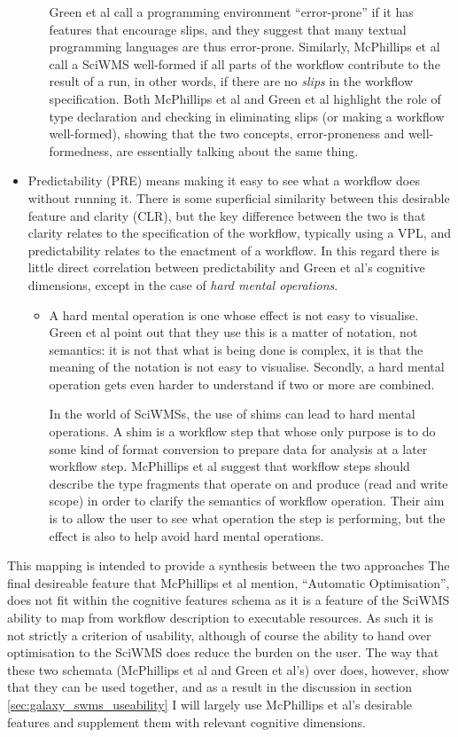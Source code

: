 \documentclass[a4paper,10pt]{scrreprt}
\begin{document}
\begin{itemize}
\begin{itemize}
Green et al call a programming environment ``error-prone'' if it has features that encourage slips, and they suggest that many textual programming languages are thus error-prone. Similarly, McPhillips et al call a \gls{SciWMS} well-formed if all parts of the \gls{workflow} contribute to the result of a run, in other words, if there are no \emph{slips} in the workflow specification. Both McPhillips et al and Green et al highlight the role of type declaration and checking in eliminating slips (or making a workflow well-formed), showing that the two concepts, error-proneness and well-formedness, are essentially talking about the same thing.
\end{itemize}
\item Predictability (PRE) means making it easy to see what a workflow does without running it. There is some superficial similarity between this desirable feature and clarity (CLR), but the key difference between the two is that clarity relates to the specification of the \gls{workflow}, typically using a \gls{VPL}, and predictability relates to the enactment of a \gls{workflow}. In this regard there is little direct correlation between predictability and Green et al's cognitive dimensions, except in the case of \emph{hard mental operations}.
\begin{itemize}
\item A hard mental operation is one whose effect is not easy to visualise. Green et al point out that they use this is a matter of notation, not semantics: it is not that what is being done is complex, it is that the meaning of the notation is not easy to visualise. Secondly, a hard mental operation gets even harder to understand if two or more are combined.

In the world of \glspl{SciWMS}, the use of shims can lead to hard mental operations. A shim is a \gls{workflow} step that whose only purpose is to do some kind of format conversion to prepare data for analysis at a later \gls{workflow} step. McPhillips et al suggest that \gls{workflow} steps should describe the type fragments that operate on and produce (read and write scope) in order to clarify the semantics of \gls{workflow} operation. Their aim is to allow the user to see what operation the step is performing, but the effect is also to help avoid hard mental operations.
\end{itemize}
\end{itemize}

This mapping is intended to provide a synthesis between the two approaches The final desireable feature that McPhillips et al mention, ``Automatic Optimisation'', does not fit within the cognitive features schema as it is a feature of the \gls{SciWMS} ability to map from \gls{workflow} description to executable resources. As such it is not strictly a criterion of usability, although of course the ability to hand over optimisation to the \gls{SciWMS} does reduce the burden on the user. The way that these two schemata (McPhillips et al and Green et al's) over does, however, show that they can be used together, and as a result in the discussion in section \ref{sec:galaxy_swms_useability} I will largely use McPhillips et al's desirable features and supplement them with relevant cognitive dimensions.
\end{document}
